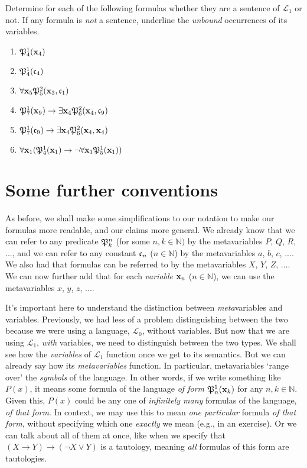 \begin{exc}
Determine for each of the following formulas whether they are a sentence of $\mathcal{L}_1$ or not. If any formula is \textit{not} a sentence, underline the \textit{unbound} occurrences of its variables. 

\begin{enumerate}
	\item $\mathfrak{P}^{1}_{4}(\mathbf{x}_{4})$
	\item $\mathfrak{P}^{1}_{4}(\mathfrak{c}_{4})$
	\item $\forall \mathbf{x}_{5}\mathfrak{P}^{2}_{5}(\mathbf{x}_{3}, \mathfrak{c}_{1})$
	\item $\mathfrak{P}^{1}_{7}(\mathbf{x}_{9}) \rightarrow \exists \mathbf{x}_{4}\mathfrak{P}^{2}_{6}(\mathbf{x}_{4}, \mathfrak{c}_{9})$
	\item $\mathfrak{P}^{1}_{7}(\mathfrak{c}_{9}) \rightarrow \exists \mathbf{x}_{4}\mathfrak{P}^{2}_{6}(\mathbf{x}_{4}, \mathbf{x}_{4})$
	\item $\forall \mathbf{x}_{1} (\mathfrak{P}^{1}_{4}(\mathbf{x}_{1}) \rightarrow \neg \forall \mathbf{x}_{1} \mathfrak{P}^{1}_{5}(\mathbf{x}_{1}))$
\end{enumerate}
\end{exc}

\section{Some further conventions}

As before, we shall make some simplifications to our notation to make our formulas more readable, and our claims more general. We already know that we can refer to any predicate $\mathfrak{P}^{n}_{k}$ (for some $n, k \in \mathbb{N})$ by the metavariables $P$, $Q$, $R$, $...$, and we can refer to any constant $\mathfrak{c}_{n}$ ($n \in \mathbb{N}$) by the metavariables $a$, $b$, $c$, $...$. We also had that formulas can be referred to by the metavariables $X$, $Y$, $Z$, $...$. We can now further add that for each \textit{variable} $\mathbf{x}_{n}$ ($n \in \mathbb{N}$), we can use the metavariables $x$, $y$, $z$, $...$. 

It's important here to understand the distinction between \textit{meta}variables and variables. Previously, we had less of a problem distinguishing between the two because we were using a language, $\mathcal{L}_0$, without variables. But now that we are using $\mathcal{L}_1$, \textit{with} variables, we need to distinguish between the two types. We shall see how the \textit{variables} of $\mathcal{L}_1$ function once we get to its semantics. But we can already say how its \textit{metavariables} function. In particular, metavariables `range over' the \textit{symbols} of the language. In other words, if we write something like $P(x)$, it means some formula of the language \textit{of form} $\mathfrak{P}^{1}_{n}(\mathbf{x}_{k})$ for any $n, k \in \mathbb{N}$. Given this, $P(x)$ could be any one of \textit{infinitely many} formulas of the language, \textit{of that form}. In context, we may use this to mean \textit{one particular} formula \textit{of that form}, without specifying which one \textit{exactly} we mean (e.g., in an exercise). Or we can talk about all of them at once, like when we specify that $(X \rightarrow Y) \rightarrow (\neg X \vee Y)$ is a tautology, meaning \textit{all} formulas of this form are tautologies. 

